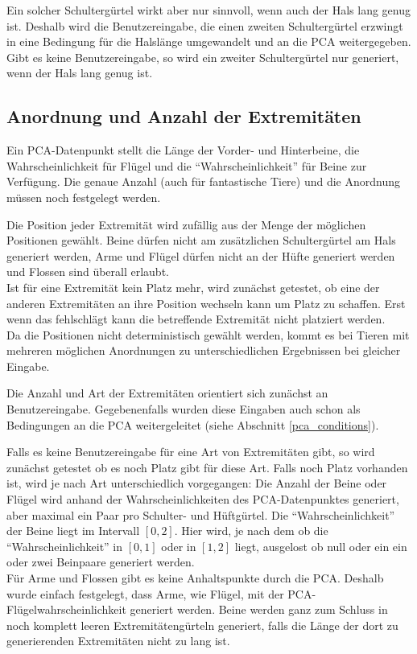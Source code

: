Ein solcher Schultergürtel wirkt aber nur sinnvoll, wenn auch der Hals lang genug ist. Deshalb wird die Benutzereingabe, die einen zweiten Schultergürtel erzwingt in eine Bedingung für die Halslänge umgewandelt und an die PCA weitergegeben. Gibt es keine Benutzereingabe, so wird ein zweiter Schultergürtel nur generiert, wenn der Hals lang genug ist.

\subsection{Anordnung und Anzahl der Extremitäten}

Ein PCA-Datenpunkt stellt die Länge der Vorder- und Hinterbeine, die Wahrscheinlichkeit für Flügel und die "`Wahrscheinlichkeit"' für Beine zur Verfügung.
Die genaue Anzahl (auch für fantastische Tiere) und die Anordnung müssen noch festgelegt werden.

Die Position jeder Extremität wird zufällig aus der Menge der möglichen Positionen gewählt. Beine dürfen nicht am zusätzlichen Schultergürtel am Hals generiert werden, Arme und Flügel dürfen nicht an der Hüfte generiert werden und Flossen sind überall erlaubt.\\
Ist für eine Extremität kein Platz mehr, wird zunächst getestet, ob eine der anderen Extremitäten an ihre Position wechseln kann um Platz zu schaffen. Erst wenn das fehlschlägt kann die betreffende Extremität nicht platziert werden.\\
Da die Positionen nicht deterministisch gewählt werden, kommt es bei Tieren mit mehreren möglichen Anordnungen zu unterschiedlichen Ergebnissen bei gleicher Eingabe.

Die Anzahl und Art der Extremitäten orientiert sich zunächst an Benutzereingabe. Gegebenenfalls wurden diese Eingaben auch schon als Bedingungen an die PCA weitergeleitet (siehe Abschnitt \ref{pca_conditions}).

Falls es keine Benutzereingabe für eine Art von Extremitäten gibt, so wird zunächst getestet ob es noch Platz gibt für diese Art. Falls noch Platz vorhanden ist, wird je nach Art unterschiedlich vorgegangen:
Die Anzahl der Beine oder Flügel wird anhand der Wahrscheinlichkeiten des PCA-Datenpunktes generiert, aber maximal ein Paar pro Schulter- und Hüftgürtel. Die "`Wahrscheinlichkeit"' der Beine liegt im Intervall $[0, 2]$. Hier wird, je nach dem ob die "`Wahrscheinlichkeit"' in $[0, 1]$ oder in $[1, 2]$ liegt, ausgelost ob null oder ein \bzw ein oder zwei Beinpaare generiert werden.\\
Für Arme und Flossen gibt es keine Anhaltspunkte durch die PCA. Deshalb wurde einfach festgelegt, dass Arme, wie Flügel, mit der PCA-Flügelwahrscheinlichkeit generiert werden. Beine werden ganz zum Schluss in noch komplett leeren Extremitätengürteln generiert, falls die Länge der dort zu generierenden Extremitäten nicht zu lang ist.

